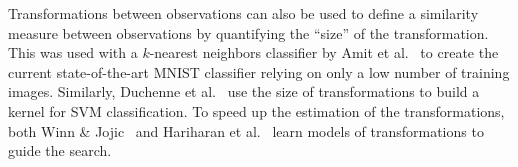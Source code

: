 \documentclass[twoside]{article}
\begin{document}
  Transformations between observations can also be used to define a similarity
  measure between observations by quantifying the ``size'' of the transformation.
  This was used with a $k$-nearest neighbors classifier by Amit et al.~\cite{Amit:ijcv:2007}
  to create the current state-of-the-art MNIST classifier relying on only a low
  number of training images. Similarly, Duchenne et al.~\cite{duchenne2011graph}
  use the size of transformations to build a kernel for SVM classification.
  To speed up the estimation of the transformations, both Winn \& Jojic~\cite{winn2005locus}
  and Hariharan et al.~\cite{hariharan2014detecting} learn models of transformations to guide the search.
  
\end{document}
